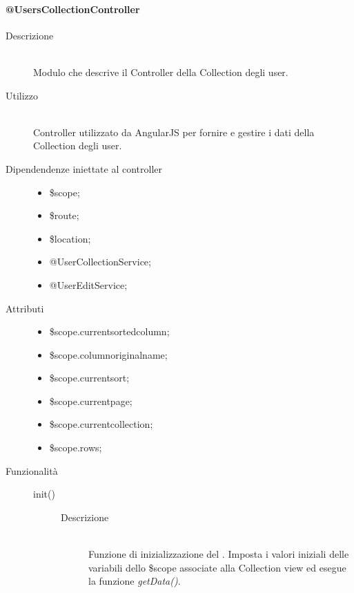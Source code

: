 \paragraph{@UsersCollectionController}
\begin{description}
 \item[Descrizione] \hfill \\
 Modulo che descrive il Controller della Collection degli user.
 
 \item[Utilizzo] \hfill \\
 Controller utilizzato da AngularJS per fornire e gestire i dati della Collection degli user.
 
 \item[Dipendendenze iniettate al controller] \hfill
 \begin{itemize}
  \item \$scope;
  \item \$route;
  \item \$location;
  \item @UserCollectionService;
  \item @UserEditService;
 \end{itemize}
 
 \item[Attributi] \hfill
 \begin{itemize}
 \item \$scope.current\textunderscore sorted\textunderscore column;
 \item \$scope.column\textunderscore original\textunderscore name;
 \item \$scope.current\textunderscore sort;
 \item \$scope.current\textunderscore page;
 \item \$scope.current\textunderscore collection;
 \item \$scope.rows;
 \end{itemize}
 
 \item[Funzionalità] \hfill
 \begin{description}
  \item[init()] \hfill
  \begin{description}
   	\item[Descrizione] \hfill \\
  Funzione di inizializzazione del . Imposta i valori iniziali delle variabili dello
  \$scope associate alla Collection view ed esegue la funzione \textit{getData()}.
    \end{description}


\end{description}
\end{description}
